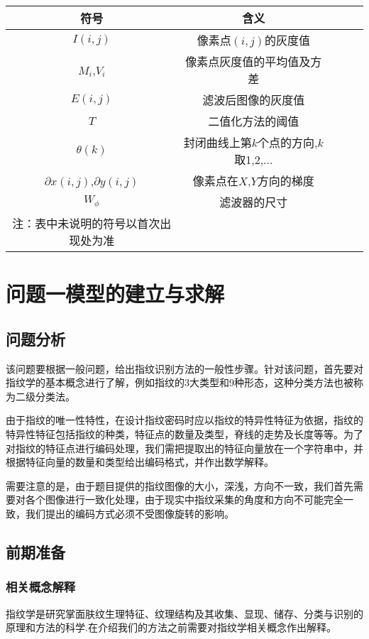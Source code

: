 \documentclass[withoutpreface,bwprint]{cumcmthesis} %
\begin{document}
\begin{center}
	\begin{tabular}{ccccc}
		\toprule[1.5pt]
		符号 & 含义\\
		\midrule[1pt]
		$I$$(i,j)$ & 像素点$(i,j)$的灰度值\\
		$M_{i}$,$V_{i}$ & 像素点灰度值的平均值及方差\\
           $E$$(i,j)$ & 滤波后图像的灰度值\\
           $T$        &  二值化方法的阈值\\
           $\theta(k) $        & 封闭曲线上第$k$个点的方向,$k$取1,2,...\\
           $\partial$$x(i,j)$,$\partial$$y(i,j)$ &像素点在$X$,$Y$方向的梯度\\
           $W_{\phi}$  & 滤波器的尺寸\\
		\bottomrule[1.5pt]
		注：表中未说明的符号以首次出现处为准
	\end{tabular}
\end{center}


\section{问题一模型的建立与求解}
\subsection{问题分析}
该问题要根据一般问题，给出指纹识别方法的一般性步骤。针对该问题，首先要对指纹学的基本概念进行了解，例如指纹的3大类型和9种形态，这种分类方法也被称为二级分类法。

由于指纹的唯一性特性，在设计指纹密码时应以指纹的特异性特征为依据，指纹的特异性特征包括指纹的种类，特征点的数量及类型，脊线的走势及长度等等。为了对指纹的特征点进行编码处理，我们需把提取出的特征向量放在一个字符串中，并根据特征向量的数量和类型给出编码格式，并作出数学解释。

需要注意的是，由于题目提供的指纹图像的大小，深浅，方向不一致，我们首先需要对各个图像进行一致化处理，由于现实中指纹采集的角度和方向不可能完全一致，我们提出的编码方式必须不受图像旋转的影响。

\subsection{前期准备}

\subsubsection{相关概念解释}
指纹学是研究掌面肤纹生理特征、纹理结构及其收集、显现、储存、分类与识别的原理和方法的科学.在介绍我们的方法之前需要对指纹学相关概念作出解释。
\end{document}
